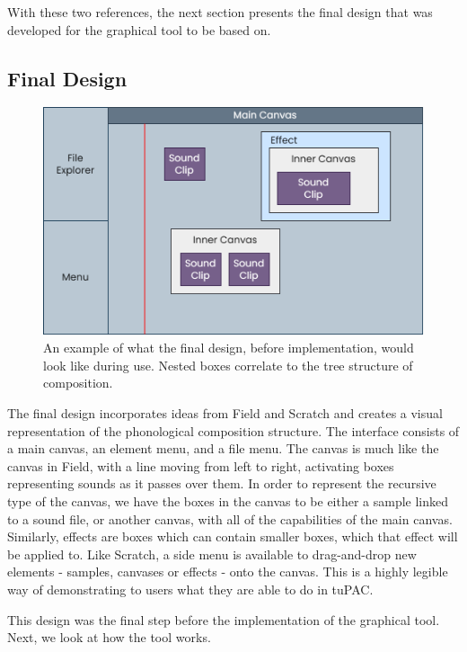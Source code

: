 \documentclass[12pt,a4paper,oneside,openright]{report}
\begin{document}
With these two references, the next section presents the final design that was developed for the graphical tool to be based on.

\newpage
\subsection{Final Design}\label{sec:final_design}
\begin{figure}[h]
    \centering
    \includegraphics[scale=0.4]{images/final_design.png}
    \caption{An example of what the final design, before implementation, would look like during use. Nested boxes correlate to the tree structure of composition.}
    \label{fig:final_design}
\end{figure}

The final design incorporates ideas from Field and Scratch and creates a visual representation of the phonological composition structure. The interface consists of a main canvas, an element menu, and a file menu. The canvas is much like the canvas in Field, with a line moving from left to right, activating boxes representing sounds as it passes over them. In order to represent the recursive type of the canvas, we have the boxes in the canvas to be either a sample linked to a sound file, or another canvas, with all of the capabilities of the main canvas. Similarly, effects are boxes which can contain smaller boxes, which that effect will be applied to. Like Scratch, a side menu is available to drag-and-drop new elements - samples, canvases or effects - onto the canvas. This is a highly legible way of demonstrating to users what they are able to do in tuPAC.

This design was the final step before the implementation of the graphical tool. Next, we look at how the tool works.
\end{document}
